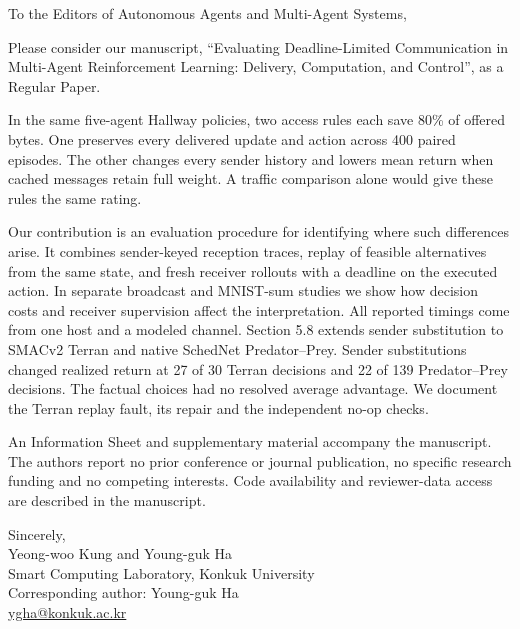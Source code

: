 \documentclass[11pt,a4paper]{article}
\begin{document}
To the Editors of Autonomous Agents and Multi-Agent Systems,

Please consider our manuscript, ``Evaluating Deadline-Limited Communication in Multi-Agent Reinforcement Learning: Delivery, Computation, and Control'', as a Regular Paper.

In the same five-agent Hallway policies, two access rules each save 80\% of offered bytes. One preserves every delivered update and action across 400 paired episodes. The other changes every sender history and lowers mean return when cached messages retain full weight. A traffic comparison alone would give these rules the same rating.

Our contribution is an evaluation procedure for identifying where such differences arise. It combines sender-keyed reception traces, replay of feasible alternatives from the same state, and fresh receiver rollouts with a deadline on the executed action. In separate broadcast and MNIST-sum studies we show how decision costs and receiver supervision affect the interpretation. All reported timings come from one host and a modeled channel. Section 5.8 extends sender substitution to SMACv2 Terran and native SchedNet Predator--Prey. Sender substitutions changed realized return at 27 of 30 Terran decisions and 22 of 139 Predator--Prey decisions. The factual choices had no resolved average advantage. We document the Terran replay fault, its repair and the independent no-op checks.

An Information Sheet and supplementary material accompany the manuscript. The authors report no prior conference or journal publication, no specific research funding and no competing interests. Code availability and reviewer-data access are described in the manuscript.

Sincerely,\\
Yeong-woo Kung and Young-guk Ha\\
Smart Computing Laboratory, Konkuk University\\
Corresponding author: Young-guk Ha\\
\href{mailto:ygha@konkuk.ac.kr}{ygha@konkuk.ac.kr}
\end{document}
